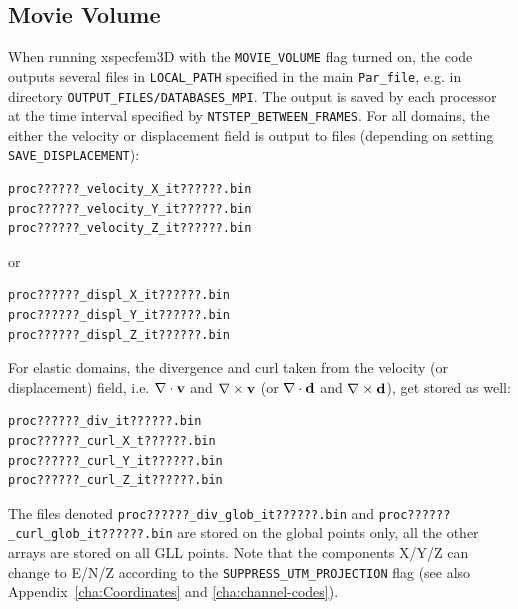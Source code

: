 \subsection{Movie Volume}\label{sub:Movie-Volume}

When running xspecfem3D with the
\texttt{\small MOVIE\_VOLUME}
flag turned on, the code outputs several files in \texttt{\small LOCAL\_PATH}
specified in the main \texttt{\small Par\_file},
e.g. in directory \texttt{\small OUTPUT\_FILES/DATABASES\_MPI}.
The output is saved by each processor at the time interval specified
by
\texttt{\small NTSTEP\_BETWEEN\_FRAMES}.
For all domains,
the either the velocity or displacement field is output to files (depending on setting \texttt{SAVE\_DISPLACEMENT}):
{\small
\begin{verbatim}
proc??????_velocity_X_it??????.bin
proc??????_velocity_Y_it??????.bin
proc??????_velocity_Z_it??????.bin
\end{verbatim}
}
\noindent
or
{\small
\begin{verbatim}
proc??????_displ_X_it??????.bin
proc??????_displ_Y_it??????.bin
proc??????_displ_Z_it??????.bin
\end{verbatim}
}
\noindent
For elastic domains, the divergence and curl taken from the velocity (or displacement) field,
i.e. $\nabla\cdot{\bf {v}}$ and $\nabla\times{\bf {v}}$ (or $\nabla\cdot{\bf {d}}$ and $\nabla\times{\bf {d}}$), get stored
as well:
{\small
\begin{verbatim}
proc??????_div_it??????.bin
proc??????_curl_X_t??????.bin
proc??????_curl_Y_it??????.bin
proc??????_curl_Z_it??????.bin
\end{verbatim}
}
\noindent
The files denoted \texttt{\small proc??????\_div\_glob\_it??????.bin} and
\texttt{\small proc??????\_curl\_glob\_it??????.bin}
are stored on the global points only, all the other arrays are stored
on all GLL points. Note that the components X/Y/Z can change to E/N/Z
according to the
\texttt{\small SUPPRESS\_UTM\_PROJECTION}
flag (see also Appendix~\ref{cha:Coordinates} and \ref{cha:channel-codes}).

